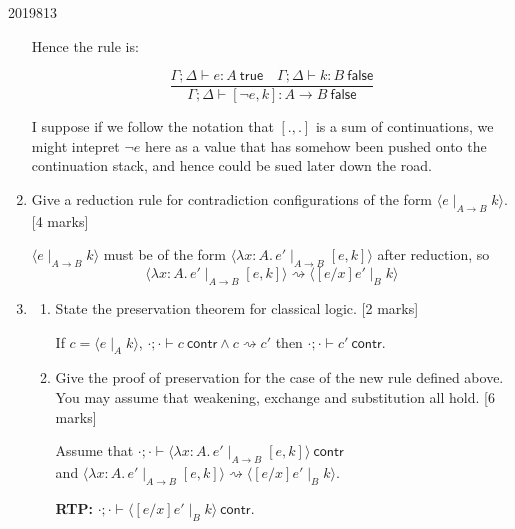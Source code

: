 \documentclass[10pt,\jkfside,a4paper]{article}
\newcommand{\answer}[1]{
    \begin{tcolorbox}[colframe=black, colback=white, sharp corners, boxrule=0.2mm, breakable]
        #1
    \end{tcolorbox}
}
\newcommand{\qmarks}[1]{\hspace*{\fill}[#1]}
\begin{document}
\begin{examquestion}{2019}{8}{13}
\begin{enumerate}
{                Hence the rule is:

                \[
                    \frac{\Gamma; \Delta \vdash e : A\ \mathsf{true} \quad \Gamma; \Delta \vdash k : B\ \mathsf{false}}{\Gamma; \Delta \vdash [\neg e, k] : A \to B\ \mathsf{false}}
                \]

                I suppose if we follow the notation that $[. , .]$ is a sum of continuations, we might intepret $\neg e$ here as a value that has somehow been pushed onto the continuation stack, and hence could be sued later down the road. 
            }

        \item
            Give a reduction rule for contradiction configurations of the form
            $\langle e \mid_{A \to B} k \rangle$. \qmarks{4 marks}

            \answer{
                $\langle e \mid_{A \to B} k \rangle$ must be of the form $\langle \lambda x : A.\, e' \mid_{A \to B} [e, k] \rangle$ after reduction, so
                \[
                    \langle \lambda x : A.\, e' \mid_{A \to B} [e, k] \rangle \rightsquigarrow \langle [e/x]e' \mid_B k \rangle
                \]
            }

        \item
            \begin{enumerate}
                \item
                    State the preservation theorem for classical logic. \qmarks{2 marks}

                    \answer{
                        If $c = \langle e \mid_A k \rangle$, $\cdot; \cdot \vdash c\ \mathsf{contr} \wedge c \rightsquigarrow c'$ then $\cdot; \cdot \vdash c'\ \mathsf{contr}$.
                    }

                \item
                    Give the proof of preservation for the case of the new rule defined
                    above. You may assume that weakening, exchange and substitution all
                    hold. \qmarks{6 marks}

                    \answer{
                        Assume that $\cdot; \cdot \vdash \langle \lambda x : A.\, e' \mid_{A \to B} [e, k] \rangle\ \mathsf{contr}$ \\
                        and $\langle \lambda x : A.\, e' \mid_{A \to B} [e, k] \rangle \rightsquigarrow \langle [e/x]e' \mid_B k \rangle$.

                        \textbf{RTP:} $\cdot; \cdot \vdash \langle [e/x]e' \mid_B k \rangle\ \mathsf{contr}$.

}
\end{enumerate}
\end{enumerate}
\end{examquestion}
\end{document}
